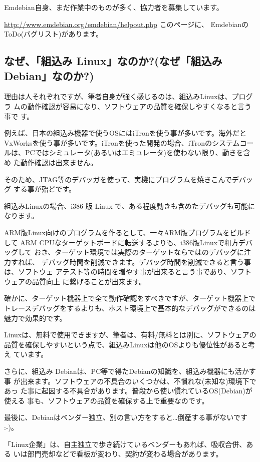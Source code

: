 \documentclass[mingoth,a4paper]{jsarticle}
\begin{document}
Emdebian自身、まだ作業中のものが多く、協力者を募集しています。

\url{http://www.emdebian.org/emdebian/helpout.php} このページに、
EmdebianのToDo(バグリスト)があります。

\subsection{なぜ、「組込み Linux」なのか?(なぜ「組込み Debian」なのか?)}

理由は人それぞれですが、筆者自身が強く感じるのは、組込みLinuxは、プログラ
ムの動作確認が容易になり、ソフトウェアの品質を確保しやすくなると言う事で
す。

例えば、日本の組込み機器で使うOSにはiTronを使う事が多いです。海外だと
VxWorksを使う事が多いです。iTronを使った開発の場合、iTronのシステムコー
ルは、PCではシミュレータ(あるいはエミュレータ)を使わない限り、動きを含め
た動作確認は出来ません。

そのため、JTAG等のデバッガを使って、実機にプログラムを焼きこんでデバッグ
する事が殆どです。

組込みLinuxの場合、i386 版 Linux で、ある程度動きも含めたデバッグも可能に
なります。

ARM版Linux向けのプログラムを作るとして、一々ARM版プログラムをビルドして
ARM CPUなターゲットボードに転送するよりも、i386版Linuxで粗方デバッグして
おき、ターゲット環境では実際のターゲットならではのデバッグに注力すれば、
デバッグ時間を削減できます。デバッグ時間を削減できると言う事は、ソフトウェ
アテスト等の時間を増やす事が出来ると言う事であり、ソフトウェアの品質向上
に繋げることが出来ます。

確かに、ターゲット機器上で全て動作確認をすべきですが、ターゲット機器上で
トレースデバッグをするよりも、ホスト環境上で基本的なデバッグができるのは
魅力で効果的です。

Linuxは、無料で使用できますが、筆者は、有料/無料とは別に、ソフトウェアの
品質を確保しやすいという点で、組込みLinuxは他のOSよりも優位性があると考え
ています。

さらに、組込み Debianは、PC等で得たDebianの知識を、組込み機器にも活かす事
が出来ます。ソフトウェアの不具合のいくつかは、不慣れな(未知な)環境下であっ
た事に起因する不具合があります。普段から使い慣れているOS(Debian)が使える
事も、ソフトウェアの品質を確保する上で重要なのです。

最後に、Debianはベンダー独立、別の言い方をすると…倒産する事がないです :-)。

「Linux企業」は、自主独立で歩き続けているベンダーもあれば、吸収合併、ある
いは部門売却などで看板が変わり、契約が変わる場合があります。
\end{document}
